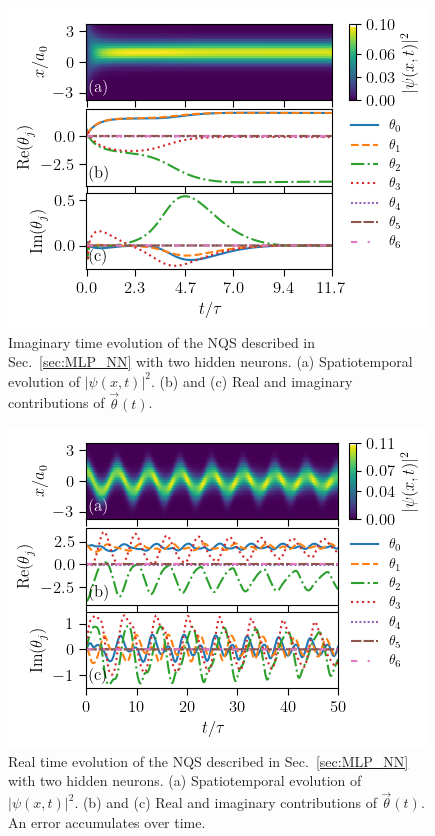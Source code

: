 \documentclass[aps,pre,superscriptaddress,amsmath,amssymb,amsfonts,twocolumn,showpacs,notitlepage]{revtex4-1}
\begin{document}
	\begin{figure} 
		\centering
		\includegraphics[width=\columnwidth]{NQS_1-2-1_imag_v1.png}
		\caption{
			Imaginary time evolution of the NQS described in Sec.~\ref{sec:MLP_NN} with two hidden neurons.
			(a) Spatiotemporal evolution of $|\psi(x,t)|^2$. 
			(b) and (c) Real and imaginary contributions of $\vec{\theta}(t)$.
		}
		\label{fig:NQS_1-2-1_imag}
	\end{figure}
	\begin{figure} 
		\centering
		\includegraphics[width=\columnwidth]{NQS_1-2-1_real_v1.png}
		\caption{
			Real time evolution of the NQS described in Sec.~\ref{sec:MLP_NN} with two hidden neurons.
			(a) Spatiotemporal evolution of $|\psi(x,t)|^2$. 
			(b) and (c) Real and imaginary contributions of $\vec{\theta}(t)$.
			An error accumulates over time.
		}
		\label{fig:NQS_1-2-1_real}
	\end{figure}
\end{document}

